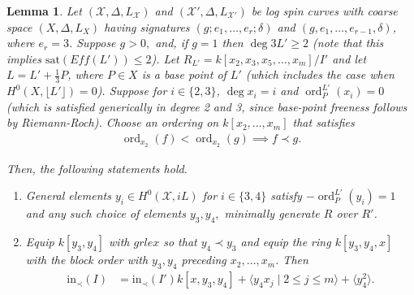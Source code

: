 \documentclass{amsart}
\theoremstyle{plain}
\newtheorem{lem}[thm]{Lemma}
\theoremstyle{definition}
\theoremstyle{remark}
\numberwithin{equation}{section}
\newcommand \sx{\mathscr X}
\DeclareMathOperator{\ord}{ord}
\newcommand \halfcan{L}
\newcommand \initial{\text{in}}
\newcommand \sat{\text{sat}}
\begin{document}
\begin{lem}
\label{lem:sat-2}
Let $(\sx, \Delta, \halfcan_\sx)$ and $(\sx', \Delta, \halfcan_{\sx'})$ be log spin curves with coarse space $(X, \Delta, \halfcan_X)$ having signatures $(g; e_1, \ldots, e_r; \delta)$ and $(g, e_1, \ldots, e_{r- 1}, \delta)$, where $e_r=3$.  Suppose $g > 0,$ and, if $g = 1$ then $\deg 3\halfcan' \geq 2$ (note that this implies $\sat(Eff(L'))\le 2$).
Let $R_{L'} = k[x_2, x_3
, x_5, \ldots, x_m]/I'$ and let $\halfcan = \halfcan' + \frac{1}{
3}P$, where $P\in X$ is a base point of $\halfcan'$ (which includes the case when $H^0(X, \lfloor \halfcan'\rfloor) = 0$).
Suppose for $i \in \{2, 3\}$, $\deg x_i = i$ and $\ord_P^{\halfcan'}(x_i)= 0$ (which is satisfied generically in degree 2 and 3, since base-point freeness follows by Riemann-Roch). Choose an ordering on $k[x_2, \ldots, x_m]$ that satisfies
\begin{align*}
	\ord_{x_2}(f) < \ord_{x_2}(g) \implies f \prec g.
\end{align*}

\noindent
Then, the following statements hold.

\begin{enumerate}
	\item[(a)] General elements  $y_i \in H^0(\sx,iL)$ for $i \in
		\{3, 4\}$ satisfy $-\ord_P^{\halfcan'}(y_i) = 1$ and any such choice of elements
		$y_3, y_4,$ minimally generate $R$ over $R'$.
	\item[(b)] Equip $k[y_3, y_4]$ with $grlex$ so that $y_4 \prec 
		y_3$
		and equip the ring $k[y_3, y_4, x]$ with the block 
		order with $y_3, y_4$ preceding $x_2, \ldots, x_m$.  Then
		\begin{align*}
			\initial_\prec(I) &= \initial_\prec(I')k[x, y_3, y_4]+\langle y_4 x_j \mid 2 \leq j \leq m \rangle +\langle y_4^2 \rangle.
		\end{align*}
\end{enumerate}
\end{lem}
\end{document}
